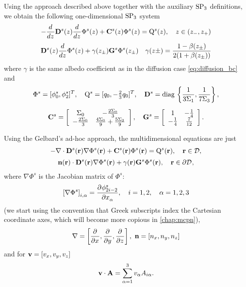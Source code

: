 Using the approach described above together with the auxiliary $\SPN[3]$ definitions, we obtain the following
one-dimensional $\SPN[3]$ system
\begin{equation}\label{eq:sp3_1d}
\begin{gathered}
	-\der{}{z} \mathbf D^s(z) \der{}{z} \Phi^s(z) + \mathbf{C}^s(z) \Phi^s(z) = \mathrm{Q}^s(z), \quad z \in
	(z_{-},z_{+})\\[.3em]
	\mat{D}^s(z) \der{}{z} \Phi^s(z) + \gamma(z_{\pm}) \mat{G}^s \Phi^s(z_{\pm})
	\quad
	\gamma(z\pm) =
	\frac{1-\beta(z_{\pm})}{2(1+\beta(z_{\pm}))}
\end{gathered}
\end{equation}
where $\gamma$ is the same albedo coefficient as in the diffusion case \eqref{eq:diffusion_bc} and
\begin{equation}\label{eq:SP3_mat}
\begin{gathered}
	\Phi^s = [\phi^s_0, \phi^s_2]^T,\quad \mathrm{Q}^s = [q_0, -\tfrac{2}{3} q_0]^T, \quad 
	\mat{D}^s = \diag \left\{\frac{1}{3\Sigma_1}, \frac{1}{7\Sigma_3}\right\},\\[.5em]
	\mat{C}^s = \left[
\begin{array}{cc}
 \Sigma _0 & -\frac{2 \Sigma _0}{3} \\
 -\frac{2 \Sigma _0}{3}  & \frac{4 \Sigma _0}{9}+\frac{5 \Sigma _2}{9}
\end{array}
\right],\quad 
\mat{G}^s = \left[
\begin{array}{cc}
 1 & -\frac{1}{4} \\
 -\frac{1}{4} & \frac{7}{12} \\
\end{array}
\right].
\end{gathered}
\end{equation}

Using the Gelbard's ad-hoc approach, the multidimensional equations are just
\begin{equation}\label{eq:sp3}
\begin{gathered}
	-\nabla\cdot \mat{D}^s(\br) \nabla \Phi^s(\br) + \mat{C}^s(\br) \Phi^s(\br) = \mathrm{Q}^s(\br), \quad \br \in
	\VV,\\[.2em]
	\bn(\br)\cdot\mat{D}^s(\br) \nabla \Phi^s(\br) + \gamma(\br) \mathbf{G}^s \Phi^s(\br), \quad \br\in\pV,
\end{gathered}
\end{equation}
where $\nabla\Phi^s$ is the Jacobian matrix of $\Phi^s$:
$$
	\left[\nabla\Phi^s\right]_{i,\alpha} = \pd{\phi^s_{2i-2}}{x_\alpha},\quad i = 1,2,\quad \alpha = 1,2,3
$$
(we start using the convention that Greek subscripts index the Cartesian coordinate axes, which will become more
copious in \cref{chap:mcpn}), $$ \nabla = \left[\pd{}{x}, \pd{}{y}, \pd{}{z}\right],\ \bn = [n_x, n_y, n_z]
$$
and for $\bv = [v_x, v_y, v_z]$
$$
	\bv \cdot \mat{A} = \sum_{\alpha=1}^3 v_\alpha A_{i\alpha}.
$$

